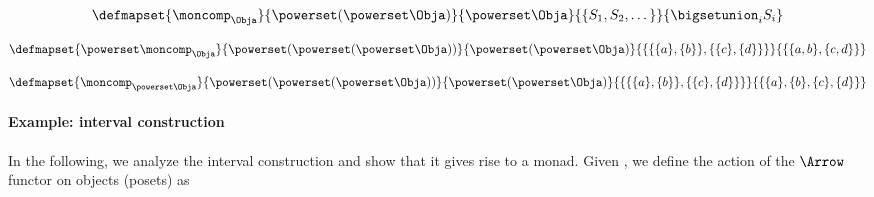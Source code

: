 {\begin{forslides}
        \begin{equation}
            \label{eq:monad-power-moncomp}
            \defmapset{
                \moncomp_{\Obja}
            }{
                \powerset (\powerset\Obja)
            }{
                \powerset \Obja
            }{
                \{S_1, S_2, \dots \}
            }{
                \bigsetunion_i S_i
            }
        \end{equation}

        \begin{equation}
            \label{eq:monad-power-power-moncomp}
            \defmapset{
                \powerset \moncomp_{\Obja}
            }{
                \powerset (\powerset (\powerset\Obja))
            }{
                \powerset (\powerset \Obja)
            }{
                \{  \{   \{a\}, \{b\} \} , \{ \{c\}, \{d\} \}\}
            }{
                \{  \{ a, b \}, \{ c, d \} \}
            }
        \end{equation}

        \begin{equation}
            \label{eq:monad-power-moncomp-power}
            \defmapset{
                \moncomp_{\powerset \Obja}
            }{
                \powerset (\powerset (\powerset\Obja))
            }{
                \powerset (\powerset \Obja)
            }{
                \{  \{   \{a\}, \{b\} \} , \{ \{c\}, \{d\} \}\}
            }{
                \{    \{a\}, \{b\}  ,  \{c\}, \{d\}  \}
            }
        \end{equation}
    \end{forslides}
}

\paragraph*{Example: interval construction}
In the following, we analyze the interval construction and show that it gives rise to a monad.
Given \Pos, we define the action of the $\Arrow$ functor on objects (posets) as

